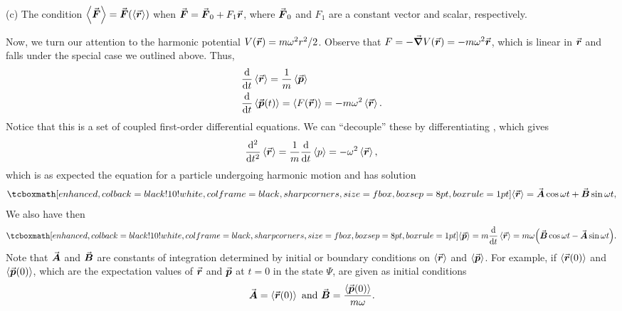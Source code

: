 {(c) The condition $\expval{\va*{F}} = \va*{F}(\expval{\va*{r}})$ when $\va*{F} = \va*{F}_{0} + F_{1} \va*{r}$, where $\va*{F}_{0}$ and $F_1$ are a constant vector and scalar, respectively.

Now, we turn our attention to the harmonic potential $V(\va*{r}) = m \omega^2 r^2 / 2$.
Observe that $F = - \grad V(\va*{r}) = - m \omega^2 \va*{r}$, which is linear in $\va*{r}$ and falls under the special case we outlined above.
Thus,
\begin{align}
    \label{eq:de-r}
    &\dv{t} \expval{\va*{r}} = \frac{1}{m} \expval{\va*{p}} \\
    \label{eq:de-p}
    &\dv{t} \expval{\va*{p}(t)} = \expval{F(\va*{r})} = - m \omega^2 \expval{\va*{r}}
.\end{align}
Notice that this is a set of coupled first-order differential equations.
We can ``decouple'' these by differentiating , which gives
\begin{eqnarray}
    \dv[2]{t} \expval{\va*{r}} = \frac{1}{m} \dv{t} \expval{p} = - \omega^2 \expval{\va*{r}}
,\end{eqnarray}
which is as expected the equation for a particle undergoing harmonic motion and has solution
\begin{eqnarray}
    \eqbox{ \expval{\va*{r}} = \va*{A} \cos{\omega t} + \va*{B} \sin{\omega t} }
,\end{eqnarray}
We also have then
\begin{eqnarray}
    \eqbox{ \expval{\va*{p}} = m \dv{t} \expval{\va*{r}} = m \omega \Big( \va*{B} \cos{\omega t} - \va*{A} \sin{\omega t} \Big) }
.\end{eqnarray}
Note that $\va*{A}$ and $\va*{B}$ are constants of integration determined by initial or boundary conditions on $\expval{\va*{r}}$ and $\expval{\va*{p}}$.
For example, if $\expval{\va*{r}(0)}$ and $\expval{\va*{p}(0)}$, which are the expectation values of $\va*{r}$ and $\va*{p}$ at $t = 0$ in the state $\Psi$, are given as initial conditions
\begin{eqnarray}
    \va*{A} = \expval{\va*{r}(0)} ~{\rm and}~ \va*{B} = \frac{\expval{\va*{p}(0)}}{m \omega}
.\end{eqnarray}


}




